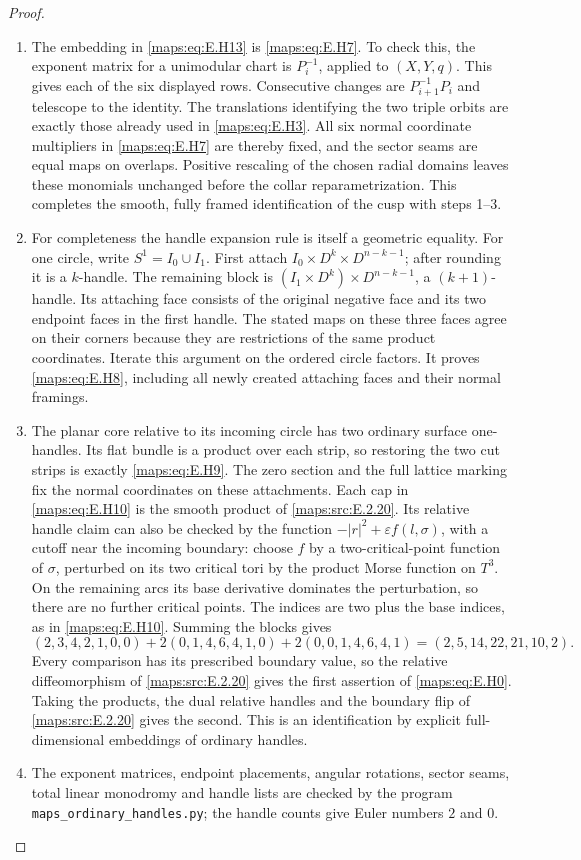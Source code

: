 \begin{proof}
\begin{enumerate}[label={$\langle1\rangle$\arabic*.},leftmargin=*]
\item The embedding in \eqref{maps:eq:E.H13} is \eqref{maps:eq:E.H7}.  To check this,
the exponent matrix for a unimodular chart is $P_i^{-1}$,
applied to $(X,Y,q)$.  This gives each of the six displayed
rows.  Consecutive changes are $P_{i+1}^{-1}P_i$ and telescope
to the identity.  The translations identifying the two
triple orbits are exactly those already used in \eqref{maps:eq:E.H3}.
All six normal coordinate multipliers in \eqref{maps:eq:E.H7} are thereby
fixed, and the sector seams are equal maps on overlaps.  Positive rescaling of the chosen
radial domains leaves these monomials unchanged before
the collar reparametrization.  This completes the smooth,
fully framed identification of the cusp with steps 1--3.

\item For completeness the handle expansion rule is itself a
geometric equality.  For one circle, write $S^1=I_0\cup I_1$.
First attach $I_0\times D^k\times D^{n-k-1}$; after rounding it
is a $k$-handle.  The remaining block is
$(I_1\times D^k)\times D^{n-k-1}$, a $(k+1)$-handle.
Its attaching face consists of the original negative face
and its two endpoint faces in the first handle.  The stated
maps on these three faces agree on their corners because
they are restrictions of the same product coordinates.
Iterate this argument on the ordered circle factors.
It proves \eqref{maps:eq:E.H8}, including all newly created attaching
faces and their normal framings.

\item The planar core relative to its incoming circle has two
ordinary surface one-handles.  Its flat bundle is a product
over each strip, so restoring the two cut strips is exactly
\eqref{maps:eq:E.H9}.  The zero section and the full lattice marking fix
the normal coordinates on these attachments.  Each cap in
\eqref{maps:eq:E.H10} is the smooth product of \ref{maps:src:E.2.20}.  Its relative
handle claim can also be checked by the function
$-|r|^2+\varepsilon f(l,\sigma)$, with a cutoff near the
incoming boundary: choose $f$ by a two-critical-point
function of $\sigma$, perturbed on its two critical tori
by the product Morse function on $T^3$.  On the remaining
arcs its base derivative dominates the perturbation, so
there are no further critical points.  The indices are
two plus the base indices, as in \eqref{maps:eq:E.H10}.    Summing the blocks
gives
\[
 (2,3,4,2,1,0,0)+2(0,1,4,6,4,1,0)
                     +2(0,0,1,4,6,4,1)
       =(2,5,14,22,21,10,2).
\]
Every comparison has its prescribed boundary value, so the
relative diffeomorphism of \ref{maps:src:E.2.20} gives the first assertion
of \eqref{maps:eq:E.H0}.  Taking the products, the dual relative handles
and the boundary flip of \ref{maps:src:E.2.20} gives the second.
This is an identification by explicit full-dimensional
embeddings of ordinary handles.  \item The exponent matrices, endpoint placements, angular rotations, sector seams, total linear monodromy and handle lists are checked by the program \texttt{maps\_ordinary\_handles.py}; the handle counts give Euler numbers $2$ and $0$.


\end{enumerate}
\end{proof}
